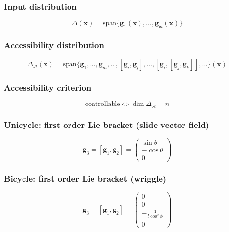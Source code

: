 \subsubsection{Input distribution}
\begin{equation*}
    \Delta(\mathbf x)=\text{span}\{\mathbf g_1(\mathbf x),\dots,\mathbf g_m(\mathbf x)\}
\end{equation*}

\subsubsection{Accessibility distribution}
\begin{equation*}
    \Delta_{\mathcal A}(\mathbf x)=\text{span}\{\mathbf g_1,\dots,\mathbf g_m,\dots,[\mathbf g_i,\mathbf g_j],\dots,[\mathbf g_i,[\mathbf g_j,\mathbf g_k]],\dots\}(\mathbf x)
\end{equation*}

\subsubsection{Accessibility criterion}
\begin{equation*}
    \text{controllable}\iff\dim\Delta_{\mathcal A}=n
\end{equation*}

\subsubsection{Unicycle: first order Lie bracket (slide vector field)}
\begin{equation*}
    \mathbf g_3=[\mathbf g_1,\mathbf g_2]=\begin{pmatrix}\sin\theta\\-\cos\theta\\0\end{pmatrix}
\end{equation*}

\subsubsection{Bicycle: first order Lie bracket (wriggle)}
\begin{equation*}
    \mathbf g_3=[\mathbf g_1,\mathbf g_2]=\begin{pmatrix}0\\0\\-\frac{1}{l\cos^2\phi}\\0\end{pmatrix}
\end{equation*}

